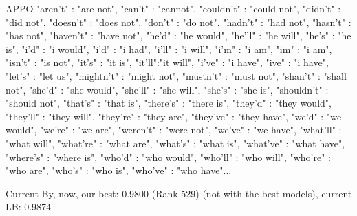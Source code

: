 \documentclass{beamer}
\begin{document}
\begin{frame}{APPO}
"aren't" : "are not",
"can't" : "cannot",
"couldn't" : "could not",
"didn't" : "did not",
"doesn't" : "does not",
"don't" : "do not",
"hadn't" : "had not",
"hasn't" : "has not",
"haven't" : "have not",
"he'd" : "he would",
"he'll" : "he will",
"he's" : "he is",
"i'd" : "i would",
"i'd" : "i had",
"i'll" : "i will",
"i'm" : "i am",
"im" : "i am",
"isn't" : "is not",
"it's" : "it is",
"it'll":"it will",
"i've" : "i have",
"ive" : "i have",
"let's" : "let us",
"mightn't" : "might not",
"mustn't" : "must not",
"shan't" : "shall not",
"she'd" : "she would",
"she'll" : "she will",
"she's" : "she is",
"shouldn't" : "should not",
"that's" : "that is",
"there's" : "there is",
"they'd" : "they would",
"they'll" : "they will",
"they're" : "they are",
"they've" : "they have",
"we'd" : "we would",
"we're" : "we are",
"weren't" : "were not",
"we've" : "we have",
"what'll" : "what will",
"what're" : "what are",
"what's" : "what is",
"what've" : "what have",
"where's" : "where is",
"who'd" : "who would",
"who'll" : "who will",
"who're" : "who are",
"who's" : "who is",
"who've" : "who have"...
\end{frame}

\begin{frame}{Current}
By, now, our best: 0.9800 (Rank 529) (not with the best models), current LB: 0.9874\\
\end{frame}
\end{document}
